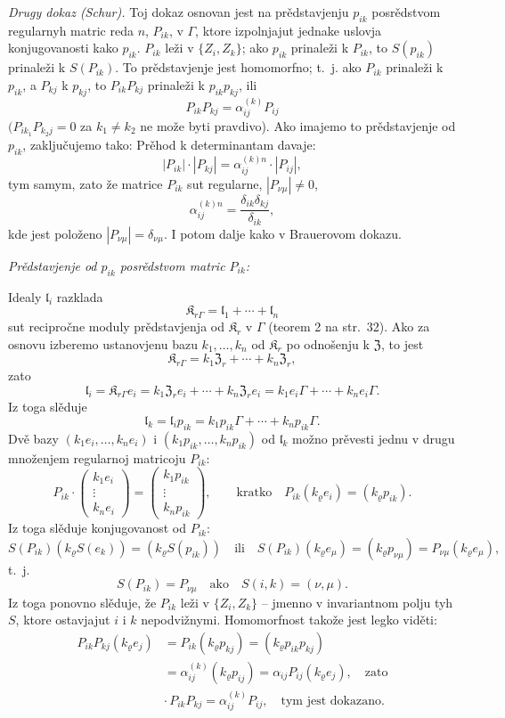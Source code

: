 \documentclass[11pt]{article}
\begin{document}
\emph{Drugy dokaz (Schur).} Toj dokaz osnovan jest na prědstavjenju \(p_{ik}\) posrědstvom regularnyh matric reda \(n\), \(P_{ik}\), v \(\Gamma\), ktore izpolnjajut jednake uslovja konjugovanosti kako \(p_{ik}\). \(P_{ik}\) leži v \(\{Z_i,Z_k\}\); ako \(p_{ik}\) prinaleži k \(P_{ik}\), to \(S(p_{ik})\) prinaleži k \(S(P_{ik})\). To prědstavjenje jest homomorfno; t.~j. ako \(P_{ik}\) prinaleži k \(p_{ik}\), a \(P_{kj}\) k \(p_{kj}\), to \(P_{ik}P_{kj}\) prinaleži k \(p_{ik}p_{kj}\), ili
\[
P_{ik}P_{kj}=\alpha_{ij}^{(k)}P_{ij}
\]
\((P_{ik_1}P_{k_2j}=0\) za \(k_1\neq k_2\) ne može byti pravdivo). Ako imajemo to prědstavjenje od \(p_{ik}\), zaključujemo tako: Prěhod k determinantam davaje:
\[
|P_{ik}|\cdot |P_{kj}|=\alpha_{ij}^{(k)n}\cdot |P_{ij}|,
\]
tym samym, zato že matrice \(P_{ik}\) sut regularne, \(|P_{\nu\mu}|\ne0\),
\[
\alpha_{ij}^{(k)n}=\frac{\delta_{ik}\delta_{kj}}{\delta_{ik}},
\]
kde jest položeno \(|P_{\nu\mu}|=\delta_{\nu\mu}\). I potom dalje kako v Brauerovom dokazu.

\emph{Prědstavjenje od \(p_{ik}\) posrědstvom matric \(P_{ik}\):}

Idealy \(\mathfrak l_i\) razklada
\[
\mathfrak K_{r\Gamma}=\mathfrak l_1+\cdots+\mathfrak l_n
\]
sut recipročne moduly prědstavjenja od \(\mathfrak K_r\) v \(\Gamma\) (teorem 2 na str.~32). Ako za osnovu izberemo ustanovjenu bazu \(k_1,\ldots,k_n\) od \(\mathfrak K_r\) po odnošenju k \(\mathfrak Z\), to jest
\[
\mathfrak K_{r\Gamma}=k_1\mathfrak Z_r+\cdots+k_n\mathfrak Z_r,
\]
zato
\[
\mathfrak l_i=\mathfrak K_{r\Gamma}e_i
=k_1\mathfrak Z_r e_i+\cdots+k_n\mathfrak Z_r e_i
=k_1e_i\Gamma+\cdots+k_ne_i\Gamma.
\]
Iz toga slěduje
\[
\mathfrak l_k=\mathfrak l_i p_{ik}
=k_1p_{ik}\Gamma+\cdots+k_np_{ik}\Gamma.
\]
Dvě bazy \((k_1e_i,\ldots,k_ne_i)\) i \((k_1p_{ik},\ldots,k_np_{ik})\) od \(\mathfrak l_k\) možno prěvesti jednu v drugu množenjem regularnoj matricoju \(P_{ik}\):
\[
P_{ik}\cdot
\begin{pmatrix}
k_1e_i\\ \vdots\\ k_ne_i
\end{pmatrix}
=
\begin{pmatrix}
k_1p_{ik}\\ \vdots\\ k_np_{ik}
\end{pmatrix},
\qquad
\text{kratko}\quad
P_{ik}(k_\varrho e_i)=(k_\varrho p_{ik}).
\]
Iz toga slěduje konjugovanost od \(P_{ik}\):
\[
S(P_{ik})(k_\varrho S(e_k))=(k_\varrho S(p_{ik}))
\quad\text{ili}\quad
S(P_{ik})(k_\varrho e_\mu)=(k_\varrho p_{\nu\mu})
=P_{\nu\mu}(k_\varrho e_\mu),
\]
t.~j.
\[
S(P_{ik})=P_{\nu\mu}\quad\text{ako}\quad S(i,k)=(\nu,\mu).
\]
Iz toga ponovno slěduje, že \(P_{ik}\) leži v \(\{Z_i,Z_k\}\) -- jmenno v invariantnom polju tyh \(S\), ktore ostavjajut \(i\) i \(k\) nepodvižnymi. Homomorfnost takože jest legko viděti:
\[
\begin{split}
P_{ik}P_{kj}(k_\varrho e_j)
&=P_{ik}(k_\varrho p_{kj})
=(k_\varrho p_{ik}p_{kj})\\
&=\alpha_{ij}^{(k)}(k_\varrho p_{ij})
=\alpha_{ij}P_{ij}(k_\varrho e_j),
\quad\text{zato}\\
&\cdot\, P_{ik}P_{kj}=\alpha_{ij}^{(k)}P_{ij},
\quad\text{tym jest dokazano.}
\end{split}
\]
\end{document}
